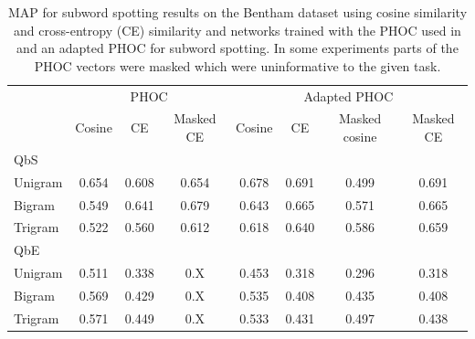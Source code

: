 \documentclass[ms,electronic,twosidetoc,letterpaper,chaptercenter,parttop,lof,lot]{byumsphd}
\begin{document}
\begin{table}
\centering
\begin{tabular}{| l | c c c | c c c c |}
  \hline
   & \multicolumn{3}{c|}{\cite{sudholt2017} PHOC} & \multicolumn{4}{c|}{Adapted PHOC}\\
   & Cosine & CE & Masked CE & Cosine & CE & Masked cosine & Masked CE   \\
  \hline   
  \hline 
  QbS & & & & & & & \\
  \hline
Unigram &  0.654 &  0.608 &  0.654 &  0.678 &  0.691 &  0.499 &  0.691 \\
Bigram  &  0.549 &  0.641 &  0.679 &  0.643 &  0.665 &  0.571 &  0.665 \\
Trigram &  0.522 &  0.560 &  0.612 &  0.618 &  0.640 &  0.586 &  0.659 \\
\hline


\hline 
  QbE & & & & & & & \\
  \hline
Unigram &  0.511 &  0.338 &  0.X &  0.453 &  0.318  &  0.296 &  0.318 \\
Bigram  &  0.569 &  0.429 &  0.X &  0.535 &  0.408  &  0.435 &  0.408 \\
Trigram &  0.571 &  0.449 &  0.X &  0.533 &  0.431  &  0.497 &  0.438 \\
\hline

\end{tabular}
\caption{MAP for subword spotting results on the Bentham dataset using cosine similarity and cross-entropy (CE) similarity and networks trained with the PHOC used in \cite{sudholt2017} and an adapted PHOC for subword spotting. In some experiments parts of the PHOC vectors were masked which were uninformative to the given task.}
\label{tab:distmetrics}
\end{table}
\end{document}
